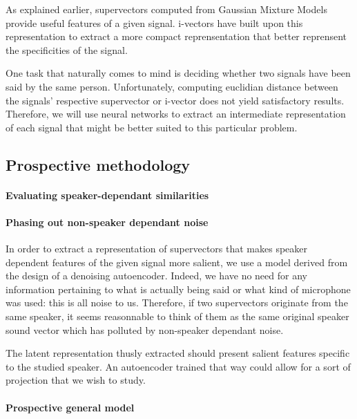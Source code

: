 \documentclass[conference]{IEEEtran}
\begin{document}
As explained earlier, supervectors computed from Gaussian Mixture Models provide
useful features of a given signal. i-vectors have built upon this representation
to extract a more compact reprensentation that better reprensent the
specificities of the signal.

One task that naturally comes to mind is deciding whether two signals have been
said by the same person. Unfortunately, computing euclidian distance between the signals'
respective supervector or i-vector does not yield satisfactory results.
Therefore, we will use neural networks to extract an intermediate representation
of each signal that might be better suited to this particular problem.

\subsection{Prospective methodology}
\label{subsec:prosp}

\paragraph{Evaluating speaker-dependant similarities}


\paragraph{Phasing out non-speaker dependant noise}

In order to extract a representation of supervectors that makes speaker
dependent features of the given signal more salient, we use a model derived from
the design of a denoising autoencoder. Indeed, we have no need for any
information pertaining to what is actually being said or what kind of microphone
was used: this is all noise to us. Therefore, if two supervectors originate from
the same speaker, it seems reasonnable to think of them as the same original \og
speaker\fg{} sound vector which has polluted by non-speaker dependant noise.

The latent representation thusly extracted should present salient features
specific to the studied speaker. An autoencoder trained that way could allow for
a sort of projection that we wish to study.

\paragraph{Prospective general model}
\end{document}
